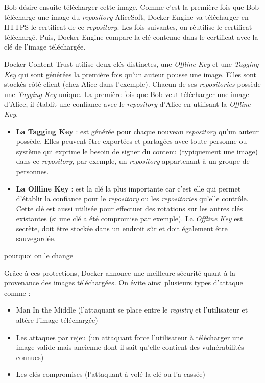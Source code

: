 \documentclass[11pt,a4paper,oneside]{report}
\begin{document}
Bob désire ensuite télécharger cette image. Comme c'est la première fois que Bob télécharge une image du \textit{repository} AliceSoft, Docker Engine va télécharger en HTTPS le certificat de ce \textit{repository}. Les fois suivantes, on réutilise le certificat téléchargé. Puis, Docker Engine compare la clé contenue dans le certificat avec la clé de l'image téléchargée.

Docker Content Trust utilise deux clés distinctes, une \textit{Offline Key} et une \textit{Tagging Key} qui sont générées la première fois qu'un auteur pousse une image. Elles sont stockés côté client (chez Alice dans l'exemple). Chacun de ses \textit{repositories} possède une \textit{Tagging Key} unique. La première fois que Bob veut télécharger une image d'Alice, il établit une confiance avec le \textit{repository} d'Alice en utilisant la \textit{Offline Key}.

\begin{itemize}
\item \textbf{La Tagging Key} : est générée pour chaque nouveau \textit{repository} qu'un auteur possède. Elles peuvent être exportées et partagées avec toute personne ou système qui exprime le besoin de signer du contenu (typiquement une image) dans ce \textit{repository}, par exemple, un \textit{repository} appartenant à un groupe de personnes.
\item \textbf{La Offline Key} : est la clé la plus importante car c'est elle qui permet d'établir la confiance pour le \textit{repository} ou les \textit{repositories} qu'elle contrôle. Cette clé est aussi utilisée pour effectuer des rotations sur les autres clés existantes (si une clé a été compromise par exemple). La \textit{Offline Key} est secrète, doit être stockée dans un endroit sûr et doit également être sauvegardée.
\end{itemize}


pourquoi on le change

Grâce à ces protections, Docker annonce une meilleure sécurité quant à la provenance des images téléchargées. On évite ainsi plusieurs types d'attaque comme :
\begin{itemize}
\item Man In the Middle (l'attaquant se place entre le \textit{registry} et l'utilisateur et altère l'image téléchargée)
\item Les attaques par rejeu (un attaquant force l'utilisateur à télécharger une image valide mais ancienne dont il sait qu'elle contient des vulnérabilités connues)
\item Les clés compromises (l'attaquant à volé la clé ou l'a cassée)
\end{itemize}
\end{document}
